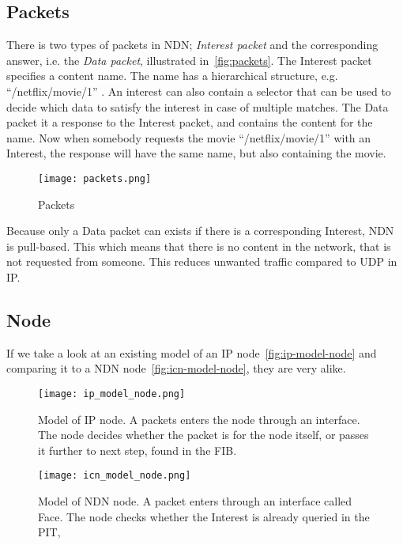 \subsection{Packets}
There is two types of packets in \gls{NDN};
\textit{Interest packet} and the corresponding answer, i.e. the \textit{Data packet}, illustrated in~\autoref{fig:packets}.
The Interest packet specifies a content name. 
The name has a hierarchical structure, e.g. ``/netflix/movie/1'' .  
An interest can also contain a selector that can be used to decide which data to satisfy the interest in case of multiple matches.
The Data packet it a response to the Interest packet, and contains the content for the name.
Now when somebody requests the movie ``/netflix/movie/1'' with an Interest, the response will have the same name, but also containing the movie. 

\begin{figure}[ht]
  \centering
  \texttt{[image: packets.png]}
  \caption{Packets}
  \label{fig:packets}
\end{figure}

Because only a Data packet can exists if there is a corresponding Interest, \gls{NDN} is pull-based.
This which means that there is no content in the network, that is not requested from someone.
This reduces unwanted traffic compared to \gls{UDP} in \gls{IP}.

\subsection{Node}
If we take a look at an existing model of an \gls{IP} node~\autoref{fig:ip-model-node} and comparing it to a \gls{NDN} node~\autoref{fig:icn-model-node}, they are very alike.

\begin{figure}[ht]
  \centering
  \texttt{[image: ip\_model\_node.png]}
  \caption{Model of \gls{IP} node. A packets enters the node through an interface. 
  The node decides whether the packet is for the node itself, or passes it further to next step, found in the \gls{FIB}.}
  \label{fig:ip-model-node}
\end{figure}

\begin{figure}[ht]
  \centering
  \texttt{[image: icn\_model\_node.png]}
  \caption{Model of \gls{NDN} node. A packet enters through an interface called Face. 
  The node checks whether the Interest is already queried in the \gls{PIT}, }
  \label{fig:icn-model-node}
\end{figure}

